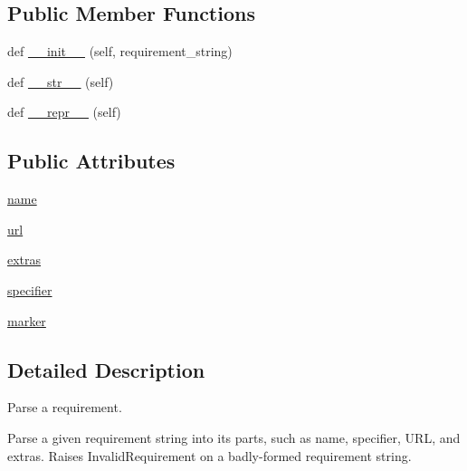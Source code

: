 \subsection*{Public Member Functions}
\begin{DoxyCompactItemize}
\item 
def \hyperlink{classsetuptools_1_1__vendor_1_1packaging_1_1requirements_1_1Requirement_a6b223eda020463f3389316de87914bfc}{\+\_\+\+\_\+init\+\_\+\+\_\+} (self, requirement\+\_\+string)
\item 
def \hyperlink{classsetuptools_1_1__vendor_1_1packaging_1_1requirements_1_1Requirement_abb0661b98aa700866ab68a7472a616f7}{\+\_\+\+\_\+str\+\_\+\+\_\+} (self)
\item 
def \hyperlink{classsetuptools_1_1__vendor_1_1packaging_1_1requirements_1_1Requirement_a5481f0c7e97a165e14a3b2b94535d3aa}{\+\_\+\+\_\+repr\+\_\+\+\_\+} (self)
\end{DoxyCompactItemize}
\subsection*{Public Attributes}
\begin{DoxyCompactItemize}
\item 
\hyperlink{classsetuptools_1_1__vendor_1_1packaging_1_1requirements_1_1Requirement_aded252a9fb2671dbb04b45d054ca0927}{name}
\item 
\hyperlink{classsetuptools_1_1__vendor_1_1packaging_1_1requirements_1_1Requirement_a246d600c3de914fa7f8badf35c3cbc80}{url}
\item 
\hyperlink{classsetuptools_1_1__vendor_1_1packaging_1_1requirements_1_1Requirement_a584915609dec44f9df6995e1b7d1d8aa}{extras}
\item 
\hyperlink{classsetuptools_1_1__vendor_1_1packaging_1_1requirements_1_1Requirement_aa95165693626d812bb32d5d8031062d1}{specifier}
\item 
\hyperlink{classsetuptools_1_1__vendor_1_1packaging_1_1requirements_1_1Requirement_af4e75090be4b6ff8af11bbd838a06a41}{marker}
\end{DoxyCompactItemize}


\subsection{Detailed Description}
\begin{DoxyVerb}Parse a requirement.

Parse a given requirement string into its parts, such as name, specifier,
URL, and extras. Raises InvalidRequirement on a badly-formed requirement
string.
\end{DoxyVerb}
 


